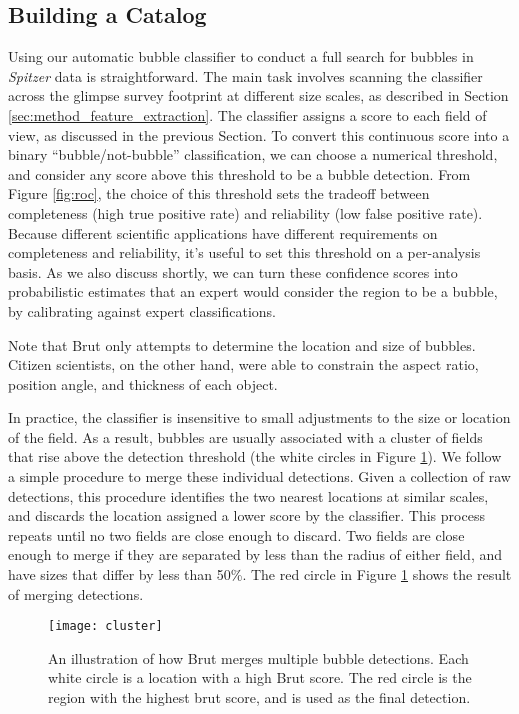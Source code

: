 \documentclass[preprint]{aastex}
\begin{document}
\subsection{Building a Catalog}
\label{sec:build}

Using our automatic bubble classifier to conduct a full search for bubbles in \textit{Spitzer} data is straightforward. The main task involves scanning the classifier across the {\sc glimpse} survey footprint at different size scales, as described in Section \ref{sec:method_feature_extraction}. The classifier assigns a score to each field of view, as discussed in the previous Section. To convert this continuous score into a binary ``bubble/not-bubble'' classification, we can choose a numerical threshold, and consider any score above this threshold to be a bubble detection. From Figure \ref{fig:roc}, the choice of this threshold sets the tradeoff between completeness (high true positive rate) and reliability (low false positive rate). Because different scientific applications
have different requirements on completeness and reliability, it's useful to set this threshold on a per-analysis basis. As we also discuss shortly, we can turn these confidence scores into probabilistic estimates that an expert would consider the region to be a bubble, by calibrating against expert classifications. 

Note that Brut only attempts to determine the location and size of bubbles. Citizen scientists, on the other hand, were able to constrain the aspect ratio, position angle, and thickness of each object. 

In practice, the classifier is insensitive to small adjustments to the size or location of the field. As a result, bubbles are usually associated with a cluster of fields that rise above the detection threshold (the white circles in Figure \ref{fig:cluster}). We follow a simple procedure to merge these individual detections. Given a collection of raw detections, this procedure identifies the two nearest locations at similar scales, and discards the location assigned a lower score by the classifier. This process repeats until no two fields are close enough to discard. Two fields are close enough to merge if they are separated by less than the radius of either field, and have sizes that differ by less than 50\%. The red circle in Figure \ref{fig:cluster} shows the result of merging detections.

\begin{figure}[h!]
\texttt{[image: cluster]}
\caption{An illustration of how Brut merges multiple bubble detections. Each white circle is a location with a high Brut score. The red circle is the region with the highest brut score, and is used as the final detection.}
\label{fig:cluster}
\end{figure}
 
\end{document}
